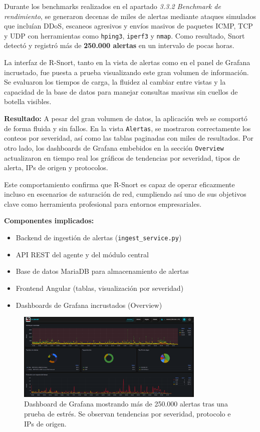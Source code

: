 \documentclass[11pt,a4paper,twoside]{report}
\begin{document}
Durante los benchmarks realizados en el apartado \textit{3.3.2 Benchmark de rendimiento}, se generaron decenas de miles de alertas mediante ataques simulados que incluían DDoS, escaneos agresivos y envíos masivos de paquetes ICMP, TCP y UDP con herramientas como \texttt{hping3}, \texttt{iperf3} y \texttt{nmap}. Como resultado, Snort detectó y registró más de \textbf{250.000 alertas} en un intervalo de pocas horas.\newline

La interfaz de R-Snort, tanto en la vista de alertas como en el panel de Grafana incrustado, fue puesta a prueba visualizando este gran volumen de información. Se evaluaron los tiempos de carga, la fluidez al cambiar entre vistas y la capacidad de la base de datos para manejar consultas masivas sin cuellos de botella visibles.\newline

\textbf{Resultado:}  
A pesar del gran volumen de datos, la aplicación web se comportó de forma fluida y sin fallos. En la vista \texttt{Alertas}, se mostraron correctamente los conteos por severidad, así como las tablas paginadas con miles de resultados. Por otro lado, los dashboards de Grafana embebidos en la sección \texttt{Overview} actualizaron en tiempo real los gráficos de tendencias por severidad, tipos de alerta, IPs de origen y protocolos.\newline

Este comportamiento confirma que R-Snort es capaz de operar eficazmente incluso en escenarios de saturación de red, cumpliendo así uno de sus objetivos clave como herramienta profesional para entornos empresariales.

\textbf{Componentes implicados:}
\begin{itemize}
	\item Backend de ingestión de alertas (\texttt{ingest\_service.py})
	\item API REST del agente y del módulo central
	\item Base de datos MariaDB para almacenamiento de alertas
	\item Frontend Angular (tablas, visualización por severidad)
	\item Dashboards de Grafana incrustados (Overview)
\end{itemize}

\begin{figure}[H]
	\centering
	\includegraphics[width=0.8\textwidth]{pruebas/1.png}
	\caption{Dashboard de Grafana mostrando más de 250.000 alertas tras una prueba de estrés. Se observan tendencias por severidad, protocolo e IPs de origen.}
	\label{fig:alertas_masivas_grafana}
\end{figure}
\end{document}

